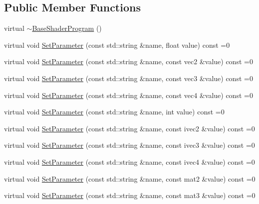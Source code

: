 \subsection*{Public Member Functions}
\begin{DoxyCompactItemize}
\item 
virtual \hyperlink{class_agmd_1_1_base_shader_program_a86dfe4c2dbe367e5db23e31a223c1cc3}{$\sim$\+Base\+Shader\+Program} ()
\item 
virtual void \hyperlink{class_agmd_1_1_base_shader_program_a686505b3561b39d3dcd1600f0ace6e9a}{Set\+Parameter} (const std\+::string \&name, float value) const =0
\item 
virtual void \hyperlink{class_agmd_1_1_base_shader_program_a16b063b92bece84a9a0a350f97962bf5}{Set\+Parameter} (const std\+::string \&name, const vec2 \&value) const =0
\item 
virtual void \hyperlink{class_agmd_1_1_base_shader_program_a8e052f62b56f4c1eeedec3c3ce0b0bc7}{Set\+Parameter} (const std\+::string \&name, const vec3 \&value) const =0
\item 
virtual void \hyperlink{class_agmd_1_1_base_shader_program_ab46d82ff3d62fac5b7b163c54191870b}{Set\+Parameter} (const std\+::string \&name, const vec4 \&value) const =0
\item 
virtual void \hyperlink{class_agmd_1_1_base_shader_program_abeb81bff85334f5915dc8b08867082f7}{Set\+Parameter} (const std\+::string \&name, int value) const =0
\item 
virtual void \hyperlink{class_agmd_1_1_base_shader_program_ac3db4f8ae11e77e15ba5cdbe81bb7082}{Set\+Parameter} (const std\+::string \&name, const ivec2 \&value) const =0
\item 
virtual void \hyperlink{class_agmd_1_1_base_shader_program_a2e81859b0d17b8c347c612fb31adc66d}{Set\+Parameter} (const std\+::string \&name, const ivec3 \&value) const =0
\item 
virtual void \hyperlink{class_agmd_1_1_base_shader_program_a336172df798e80fe5fae9b41200a5eab}{Set\+Parameter} (const std\+::string \&name, const ivec4 \&value) const =0
\item 
virtual void \hyperlink{class_agmd_1_1_base_shader_program_af2b54d840ee95715c3a395065252e9b8}{Set\+Parameter} (const std\+::string \&name, const mat2 \&value) const =0
\item 
virtual void \hyperlink{class_agmd_1_1_base_shader_program_abda61d7ebf3c1a946f58e00c79b699cb}{Set\+Parameter} (const std\+::string \&name, const mat3 \&value) const =0
\item 

\end{DoxyCompactItemize}
